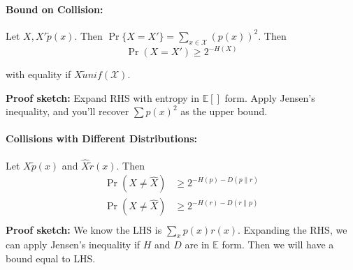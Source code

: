 \documentclass[a4paper,12pt]{report}
\begin{document}
\paragraph{Bound on Collision: } Let $X, X' \tilde p(x)$. Then $\Pr\{X = X'\} =
\sum_{x\in \mathcal X}^{} (p(x))^2$. Then \begin{equation}
\Pr(X = X') \geq 2^{-H(X)}
\end{equation}

with equality if $X\tilde unif(\mathcal X)$. 

\textbf{Proof sketch:} Expand RHS with entropy in $\mathbb E[]$ form. Apply
Jensen's inequality, and you'll recover $\sum p(x)^2$ as the upper bound. 


\paragraph{Collisions with Different Distributions: } Let $X\tilde p(x)$ and
$\hat X \tilde r(x)$. Then 
\begin{align}
	\Pr(X\neq \hat X) &\geq 2^{-H(p) - D(p\|r)} \\
	\Pr(X\neq \hat X) &\geq 2^{-H(r) - D(r\|p)} \\
\end{align}
\textbf{Proof sketch:} We know the LHS is $\sum_x p(x)r(x)$. Expanding the RHS,
we can apply Jensen's inequality if $H$ and $D$ are in $\mathbb E$ form. Then we
will have a bound equal to LHS.
\end{document}

